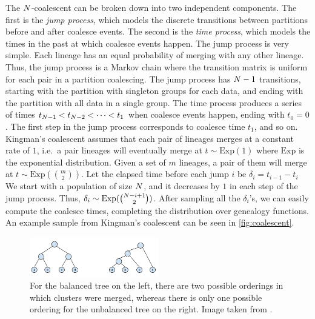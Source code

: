 The $N$-coalescent
can be broken down into two
independent components.
The first is the \emph{jump process},
which models the discrete transitions
between partitions
before and after coalesce events.
The second is the \emph{time process},
which models the times in the past
at which coalesce events happen.
The jump process is very simple.
Each lineage has an equal probability of merging
with any other lineage. Thus, the
jump process is a Markov chain
where the transition matrix is uniform
for each pair in a partition coalescing.
The jump process has $N - 1$ transitions, starting
with the partition with singleton groups
for each data, and ending with the
partition with all data in a single group.
The time process produces a series of times
$t_{N - 1} < t_{N - 2} < \cdots <  t_1$ when coalesce events happen,
ending with $t_0 = 0$.
The first step in the jump process
corresponds to coalesce time $t_1$, and so on.
Kingman's coalescent assumes
that each pair of lineages merges at a constant rate of $1$,
i.e.\
a pair lineages will eventually merge at
$t \sim \text{Exp}(1)$ where $\text{Exp}$ is the exponential distribution.
Given a set of $m$ lineages,
a pair of them will merge at
$t \sim \text{Exp}(\binom{m}{2})$.
Let the elapsed time before each jump $i$ be
$\delta_i = t_{i - 1} - t_i$
We start with a population of size $N$,
and it decreases by $1$
in each step of the jump process.
Thus, $\delta_i \sim \text{Exp}(\binom{N - i + 1}{2})$.
After sampling all the $\delta_i$'s, we can easily
compute the coalesce times,
completing the distribution over genealogy functions.
An example sample from Kingman's coalescent can be
seen in \autoref{fig:coalescent}.

\begin{figure}[H]
  \centering
  \includegraphics[width=0.5\textwidth]{img/trees/balanced}
  \caption{For the balanced tree on the left, there are two
  possible orderings in which clusters were merged, whereas there is only one possible ordering for the unbalanced tree on the right. Image taken from \citet{Boyles2012}.}
\label{fig:balanced}
\end{figure}

